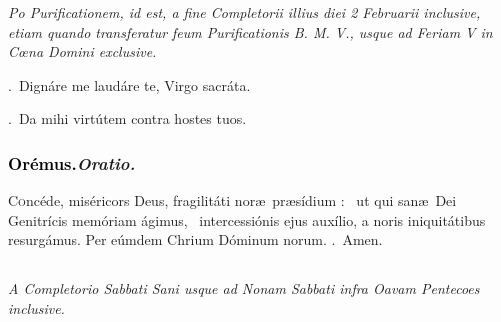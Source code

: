 \documentclass[12pt]{article} %
\newenvironment{rubric}{\vspace{2 mm}\color{benred8} \itshape \leftskip 0in \setlength{\parindent}{0.25in}}{\vspace{2 mm}}
\newenvironment{response}{\leftskip 0in \setlength{\parindent}{0in}}{\vspace{2 mm}}
\let\oldgresixstar\gresixstar
\renewcommand{\gresixstar}{\textcolor{benred8}{\oldgresixstar}}
\let\oldgredagger\gredagger
\renewcommand{\gredagger}{\textcolor{benred8}{\oldgredagger}}
\let\oldVbar\Vbar
\renewcommand{\Vbar}{\textcolor{benred8}{\oldVbar .}}
\let\oldRbar\Rbar
\renewcommand{\Rbar}{\textcolor{benred8}{\oldRbar .}}
\def\capitulumSpace{\hspace{20 mm}}
\begin{document}

\newpage

\begin{rubric}Po Purificationem, id est, a fine Completorii illius diei 2 Februarii inclusive, etiam quando transferatur feum Purificationis B. M. V., usque ad Feriam V in C\oe na Domini exclusive.\end{rubric}


\gresetfirstlineaboveinitial{\small \textsc{ \textbf{\textcolor{benred8}{VI}}}}{\small \textsc{ \textbf{\textcolor{benred8}{VI}}}}

\vspace{2mm}

\begin{response}
\Vbar\ Dign\'{a}re me laud\'{a}re te, Virgo sacr\'{a}ta.

\Rbar\ Da mihi virt\'{u}tem contra hostes tuos.

\end{response}

\subsubsection*{\textcolor{black}{Or\'{e}mus.}\capitulumSpace \emph{Oratio.}}

\begin{response}\lettrine{C}{o}nc\'{e}de, mis\'{e}ricors Deus, fragilit\'{a}ti nor\ae\ pr\ae s\'{i}dium : \gredagger\ ut qui san\ae\ Dei Genitr\'{i}cis mem\'{o}riam \'{a}gimus, \gresixstar\ intercessi\'{o}nis ejus aux\'{i}lio, a noris iniquit\'{a}tibus resurg\'{a}mus. Per e\'{u}mdem Chrium D\'{o}minum norum. \Rbar\ Amen.

\end{response}


\subsection*{}

\begin{rubric}
A Completorio Sabbati Sani usque ad Nonam Sabbati infra Oavam Pentecoes inclusive.

\end{rubric}
\end{document}
